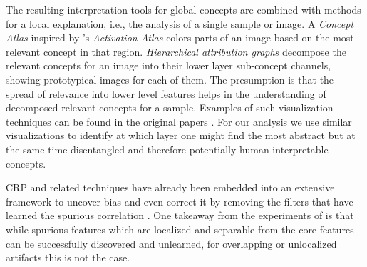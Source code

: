 The resulting interpretation tools for global concepts are combined with methods for a local explanation, i.e., the analysis of a single sample or image. A \textit{Concept Atlas} inspired by \cite{Carter2019}'s \textit{Activation Atlas} colors parts of an image based on the most relevant concept in that region. \textit{Hierarchical attribution graphs} decompose the relevant concepts for an image into their lower layer sub-concept channels, showing prototypical images for each of them. The presumption is that the spread of relevance into lower level features helps in the understanding of decomposed relevant concepts for a sample. Examples of such visualization techniques can be found in the original papers \citep{Achtibat2022, Achtibat2023}. For our analysis we use similar visualizations to identify at which layer one might find the most abstract but at the same time disentangled and therefore potentially human-interpretable concepts.

CRP and related techniques have already been embedded into an extensive framework to uncover bias and even correct it by removing the filters that have learned the spurious correlation \citep{Pahde2023,Dreyer2023,Dreyer2023a}. One takeaway from the experiments of \cite{Dreyer2023a} is that while spurious features which are localized and separable from the core features can be successfully discovered and unlearned, for overlapping or unlocalized artifacts this is not the case. 

